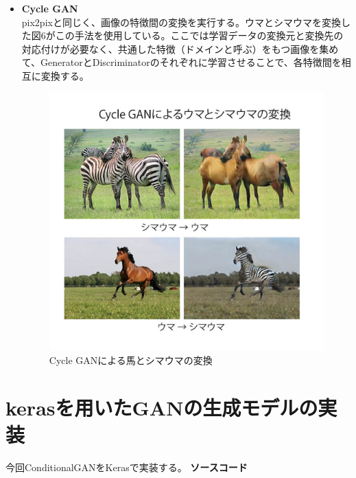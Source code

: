 \documentclass{jarticle}
\begin{document}
\begin{itemize}
\item \textbf{Cycle GAN}\\
pix2pixと同じく、画像の特徴間の変換を実行する。ウマとシマウマを変換した図6がこの手法を使用している。ここでは学習データの変換元と変換先の対応付けが必要なく、共通した特徴（ドメインと呼ぶ）をもつ画像を集めて、GeneratorとDiscriminatorのそれぞれに学習させることで、各特徴間を相互に変換する。
\begin{figure}[h]
\centering
\includegraphics[width=12cm]{pic7.jpg}
\caption{Cycle GANによる馬とシマウマの変換}
\label{GAN6}
\end{figure}

\end{itemize}

\section{kerasを用いたGANの生成モデルの実装}
今回ConditionalGANをKerasで実装する。
\textbf{ソースコード}

\end{document}

